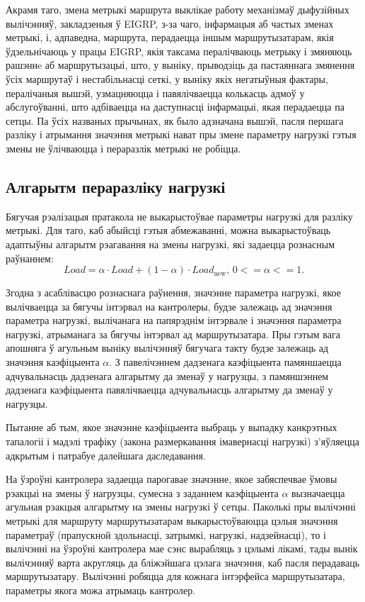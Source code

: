 Акрамя таго, змена метрыкі маршрута выклікае работу механізмаў
дыфузійных вылічэнняў, закладзеныя ў EIGRP, з-за чаго, інфармацыя
аб частых зменах метрыкі, і, адпаведна, маршрута, перадаецца
іншым маршрутызатарам, якія ўдзельнічаюць у працы EIGRP, якія таксама пералічваюць
метрыку і змяняюць рашэннe аб маршрутызацыі, што, у выніку, прыводзіць да
пастаяннага змянення ўсіх маршрутаў і нестабільнасці сеткі,
у выніку якіх негатыўныя фактары, пералічаныя вышэй, узмацняюцца
і павялічваецца колькасць адмоў у абслугоўванні, што адбіваецца на даступнасці інфармацыі, якая перадаецца па сетцы.
Па ўсіх названых прычынах, як было адзначана вышэй, пасля першага
разліку і атрымання значэння метрыкі нават пры змене параметру нагрузкі гэтыя
змены не ўлічваюцца і пераразлік метрыкі не робіцца.

\subsection{Алгарытм пераразліку нагрузкі}

Бягучая рэалізацыя пратакола не выкарыстоўвае параметры нагрузкі для разліку метрыкі. Для таго, каб абыйсці гэтыя абмежаванні, можна выкарыстоўваць
адаптыўны алгарытм рэагавання на змены нагрузкі, які задаецца рознасным раўнаннем:
\begin{equation}
    Load = \alpha \cdot Load + (1 - \alpha) \cdot Load_\text{new}\text{, } 0 <= \alpha <= 1.
\end{equation}

Згодна з асаблівасцю рознаснага раўнення, значэнне параметра нагрузкі,
якое вылічваецца за бягучы інтэрвал на кантролеры, будзе залежаць ад значэння
параметра нагрузкі, вылічанага на папярэднім інтэрвале і значэння параметра нагрузкі, атрыманага за бягучы інтэрвал ад маршрутызатара. Пры гэтым вага
апошняга ў агульным выніку вылічэнняў бягучага такту будзе залежаць ад
значэння каэфіцыента $\alpha$. З павелічэннем дадзенага каэфіцыента памяншаецца адчувальнасць дадзенага алгарытму да зменаў у нагрузцы, з памяншэннем дадзенага каэфіцыента павялічваецца адчувальнасць алгарытму
да зменаў у нагрузцы.

Пытанне аб тым, якое значэнне каэфіцыента выбраць
у выпадку канкрэтных тапалогіі і мадэлі трафіку (закона размеркавання імавернасці нагрузкі) з'яўляецца адкрытым і патрабуе далейшага даследавання.

На ўзроўні кантролера задаецца парогавае значэнне, якое забяспечвае ўмовы рэакцыі на змены ў нагрузцы, сумесна з заданнем каэфіцыента $\alpha$ вызначаецца агульная рэакцыя алгарытму на змены нагрузкі ў сетцы.
Паколькі пры вылічэнні метрыкі для маршруту маршрутызатарам выкарыстоўваюцца цэлыя значэння параметраў (прапускной здольнасці, затрымкі,
нагрузкі, надзейнасці), то і вылічэнні на ўзроўні кантролера мае сэнс
вырабляць з цэлымі лікамі, тады вынік вылічэнняў варта акругляць
да бліжэйшага цэлага значэння, каб пасля перадаваць маршрутызатару.
Вылічэнні робяцца для кожнага інтэрфейса маршрутызатара, параметры якога можа атрымаць кантролер.

